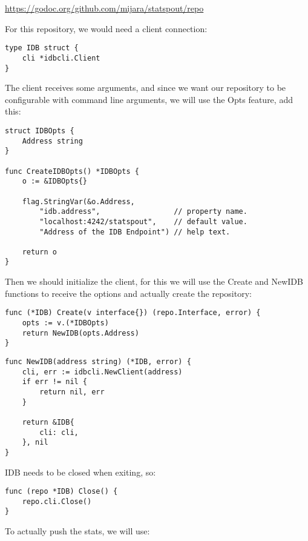 \begin{center}
\url{https://godoc.org/github.com/mijara/statspout/repo}
\end{center}

For this repository, we would need a client connection:

\begin{lstlisting}[language=Golang]
type IDB struct {
    cli *idbcli.Client
}
\end{lstlisting}

The client receives some arguments, and since we want our repository to be configurable with command line arguments, we will use the Opts feature, add this:

\begin{lstlisting}[language=Golang]
struct IDBOpts {
    Address string
}

func CreateIDBOpts() *IDBOpts {
    o := &IDBOpts{}

	flag.StringVar(&o.Address,
		"idb.address",                 // property name.
		"localhost:4242/statspout",    // default value.
		"Address of the IDB Endpoint") // help text.

	return o
}
\end{lstlisting}

Then we should initialize the client, for this we will use the Create and NewIDB functions to receive the options and actually create the repository:

\begin{lstlisting}[language=Golang]
func (*IDB) Create(v interface{}) (repo.Interface, error) {
    opts := v.(*IDBOpts)
	return NewIDB(opts.Address)
}
\end{lstlisting}

\begin{lstlisting}[language=Golang]
func NewIDB(address string) (*IDB, error) {
    cli, err := idbcli.NewClient(address)
    if err != nil {
        return nil, err
    }

	return &IDB{
        cli: cli,
    }, nil
}
\end{lstlisting}

IDB needs to be closed when exiting, so:

\begin{lstlisting}[language=Golang]
func (repo *IDB) Close() {
    repo.cli.Close()
}
\end{lstlisting}

To actually push the stats, we will use:

